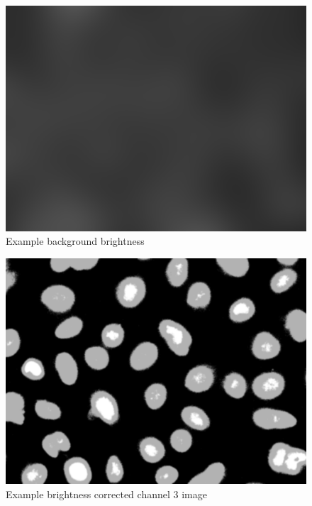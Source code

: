 \documentclass[a4paper, 12pt, twoside]{article}
\begin{document}
\begin{figure}[H]
\centering
\includegraphics[height=\linewidth, angle=90]{images/example_Kanal3_gaussian100}
Example background brightness
\end{figure}

\begin{figure}[H]
\centering
\includegraphics[height=\linewidth, angle=90]{images/example_Kanal3_multiply178_gaussian2}
Example brightness corrected channel 3 image
\end{figure}
\end{document}

